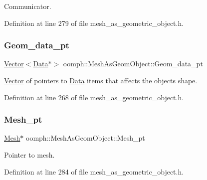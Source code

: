 Communicator. 



Definition at line 279 of file mesh\+\_\+as\+\_\+geometric\+\_\+object.\+h.

\mbox{\label{classoomph_1_1MeshAsGeomObject_af99c1c7301530bc8123a1ac7f9739f22}} 
\subsubsection{\texorpdfstring{Geom\+\_\+data\+\_\+pt}{Geom\_data\_pt}}
{\footnotesize\ttfamily \hyperlink{classoomph_1_1Vector}{Vector}$<$\hyperlink{classoomph_1_1Data}{Data}$\ast$$>$ oomph\+::\+Mesh\+As\+Geom\+Object\+::\+Geom\+\_\+data\+\_\+pt\hspace{0.3cm}{\ttfamily [private]}}



\hyperlink{classoomph_1_1Vector}{Vector} of pointers to \hyperlink{classoomph_1_1Data}{Data} items that affects the object\textquotesingle{}s shape. 



Definition at line 268 of file mesh\+\_\+as\+\_\+geometric\+\_\+object.\+h.

\mbox{\label{classoomph_1_1MeshAsGeomObject_aba2f3c5644e8625d4bd7503c781e2d54}} 
\subsubsection{\texorpdfstring{Mesh\+\_\+pt}{Mesh\_pt}}
{\footnotesize\ttfamily \hyperlink{classoomph_1_1Mesh}{Mesh}$\ast$ oomph\+::\+Mesh\+As\+Geom\+Object\+::\+Mesh\+\_\+pt\hspace{0.3cm}{\ttfamily [private]}}



Pointer to mesh. 



Definition at line 284 of file mesh\+\_\+as\+\_\+geometric\+\_\+object.\+h.

